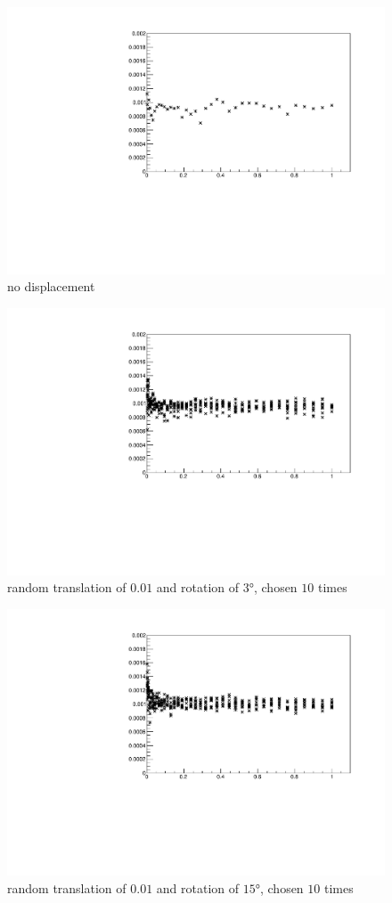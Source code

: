 \begin{figure}[H]
\centering
\includegraphics[width=.7\textwidth]{fig/bunny_globmin.pdf}
\caption{no displacement}
\label{fig:bunny_globmin}
\end{figure}
\begin{figure}[H]
\centering
\includegraphics[width=.7\textwidth]{fig/bunny_globsmall.pdf}
\caption{random translation of $0.01$ and rotation of $3 \si{\degree}$, chosen $10$ times}
\label{fig:bunny_globsmall}
\end{figure}
\begin{figure}[H]
\centering
\includegraphics[width=.7\textwidth]{fig/bunny_globmed.pdf}
\caption{random translation of $0.01$ and rotation of $15 \si{\degree}$, chosen $10$ times}
\label{fig:bunny_globmed}
\end{figure}

